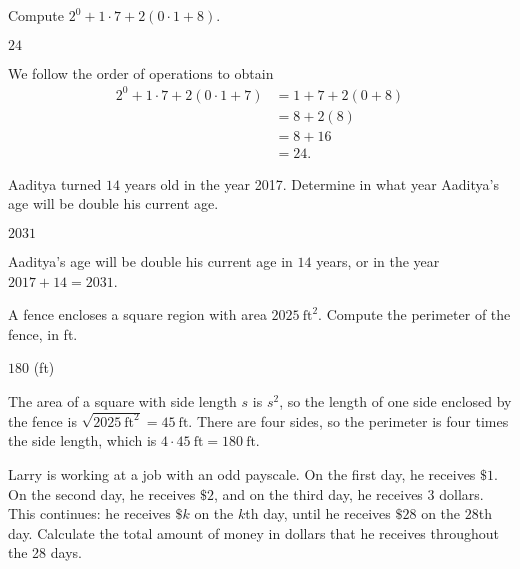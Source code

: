 \documentclass[11pt]{article}
\begin{document}
\setlength{\parindent}{0pt}

\begin{problem}
Compute $2^0 + 1 \cdot 7 + 2(0 \cdot 1 + 8)$.
\end{problem}

\begin{answer}
$\boxed{24}$
\end{answer}

\begin{solution}
We follow the order of operations to obtain
\begin{align*}
2^0 + 1 \cdot 7 + 2(0 \cdot 1 + 7) &= 1 + 7 + 2(0 + 8) \\
&= 8 + 2(8) \\ 
&= 8 + 16 \\
&= \boxed{24}.
\end{align*}
\end{solution}


\begin{problem}
Aaditya turned $14$ years old in the year 2017. Determine in what year Aaditya's age will be double his current age.
\end{problem}

\begin{answer}
$\boxed{2031}$
\end{answer}

\begin{solution}
Aaditya's age will be double his current age in $14$ years, or in the year $2017 + 14 = \boxed{2031}$.
\end{solution}


\begin{problem}
A fence encloses a square region with area $2025\ \text{ft}^2$. Compute the perimeter of the fence, in ft.
\end{problem}

\begin{answer}
$\boxed{180}$ (ft)
\end{answer}

\begin{solution}
The area of a square with side length $s$ is $s^2$, so the length of one side enclosed by the fence is
$\sqrt{2025\ \text{ft}^2} = 45\ \text{ft}$. There are four sides, so the perimeter is four times the side
length, which is $4 \cdot 45\ \text{ft} = \boxed{180}\ \text{ft}$.
\end{solution}


\begin{problem}
Larry is working at a job with an odd payscale. On the first day, he receives $\$1$.
On the second day, he receives $\$2$, and on the third day, he receives $3$ dollars. This continues: he receives $\$k$ on
the $k$th day, until he receives $\$28$ on the $28$th day. Calculate the total amount
of money in dollars that he receives throughout the 28 days.
\end{problem}
\end{document}

